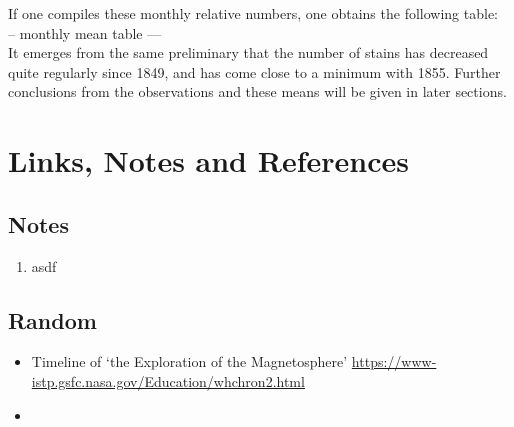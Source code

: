 \documentclass[12pt]{article}
\begin{document}
If one compiles these monthly relative numbers, one obtains the following table:\\

-- monthly mean table ---\\

It emerges from the same preliminary that the number of stains has decreased quite regularly since 1849, and has come close to a minimum with 1855. Further conclusions from the observations and these means will be given in later sections.\\



\section{Links, Notes and References}

\subsection{Notes}
\begin{enumerate}
    \item asdf
\end{enumerate}

\subsection{Random}

\begin{itemize}
    \item Timeline of `the Exploration of the Magnetosphere' \href{https://www-istp.gsfc.nasa.gov/Education/whchron2.html}{https://www-istp.gsfc.nasa.gov/Education/whchron2.html}
    \item 
\end{itemize}
\end{document}
